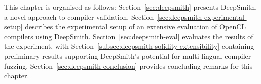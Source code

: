 This chapter is organised as follows:  Section~\ref{sec:deepsmith} presents DeepSmith, a novel approach to compiler validation. Section~\ref{sec:deepsmith-experimental-setup} describes the experimental setup of an extensive evaluation of OpenCL compilers using DeepSmith. Section~\ref{sec:deepsmith-eval} evaluates the results of the experiment, with Section~\ref{subsec:deepsmith-solidity-extensibility} containing preliminary results supporting DeepSmith's potential for multi-lingual compiler fuzzing. Section~\ref{sec:deepsmith-conclusion} provides concluding remarks for this chapter.